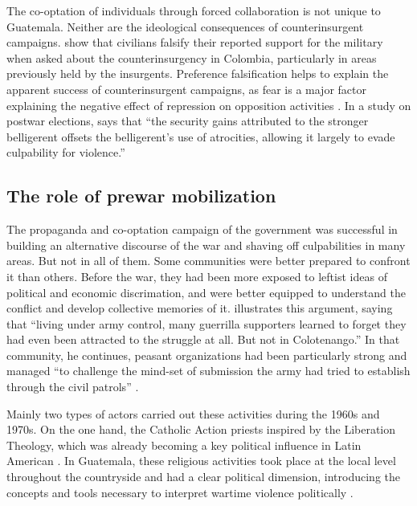 \documentclass[12pt, notitlepage]{article}
\begin{document}
The co-optation of individuals through forced collaboration is not unique to Guatemala.
Neither are the ideological consequences of counterinsurgent campaigns.
\citet{Matanock:2018aa} show that civilians falsify their reported support for the military when asked about the counterinsurgency in Colombia, particularly in areas previously held by the insurgents.
Preference falsification helps to explain the apparent success of counterinsurgent campaigns, as fear is a major factor explaining the negative effect of repression on opposition activities \citep{Young:2019aa}.
In a study on postwar elections, \citet[749]{Daly:2019aa} says that ``the security gains attributed to the stronger belligerent offsets the belligerent's use of atrocities, allowing it largely to evade culpability for violence.''

\subsection*{The role of prewar mobilization}

The propaganda and co-optation campaign of the government was successful in building an alternative discourse of the war and shaving off culpabilities in many areas.
But not in all of them.
Some communities were better prepared to confront it than others.
Before the war, they had been more exposed to leftist ideas of political and economic discrimation, and were better equipped to understand the conflict and develop collective memories of it.
\citet[223]{Kobrak:2013aa} illustrates this argument, saying that ``living under army control, many guerrilla supporters learned to forget they had even been attracted to the struggle at all. But not in Colotenango.''
In that community, he continues, peasant organizations had been particularly strong and managed ``to challenge the mind-set of submission the army had tried to establish through the civil patrols'' \citep[226]{Kobrak:2013aa}.

Mainly two types of actors carried out these activities during the 1960s and 1970s.
On the one hand, the Catholic Action priests inspired by the Liberation Theology, which was already becoming a key political influence in Latin American \citep[e.g.][]{Wood:2003aa}.
In Guatemala, these religious activities took place at the local level throughout the countryside and had a clear political dimension, introducing the concepts and tools necessary to interpret wartime violence politically \citep{Carmack:1988aa, Manz:1988aa, Manz:2004aa, LeBot:1992aa, Bateson:2013aa}.
\end{document}
